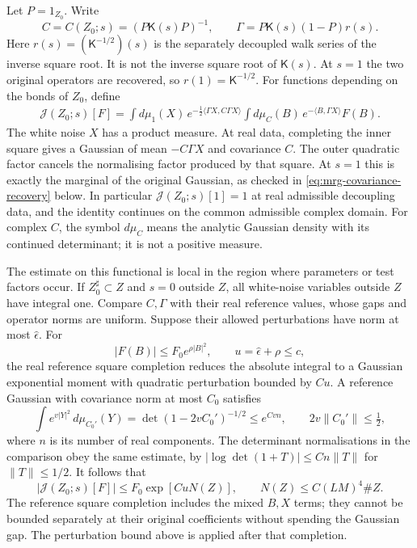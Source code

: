 \documentclass[11pt,letterpaper,reqno]{amsart}
\theoremstyle{definition}
\theoremstyle{remark}
\begin{document}
Let $P=1_{Z_0}$. Write
\[
 C=C(Z_0;s)=(P\mathsf K(s)P)^{-1},\qquad
 \Gamma=P\mathsf K(s)(1-P)r(s).
\]
Here $r(s)=(\mathsf K^{-1/2})(s)$ is the separately decoupled
walk series of the inverse square root. It is not the inverse
square root of $\mathsf K(s)$. At $s=1$ the two original
operators are recovered, so $r(1)=\mathsf K^{-1/2}$.
For functions depending on the bonds of $Z_0$, define
\begin{equation}\label{eq:deep-conditional-functional}
 \begin{split}
 \mathcal J(Z_0;s)[F]
 =\int d\mu_1(X)\,
      e^{-\frac12\langle\Gamma X,C\Gamma X\rangle}
       \int d\mu_C(B)\,
                    e^{-\langle B,\Gamma X\rangle}F(B).
 \end{split}
\end{equation}
The white noise $X$ has a product measure. At real data,
completing the inner square gives a Gaussian of mean
$-C\Gamma X$ and covariance $C$. The outer quadratic factor
cancels the normalising factor produced by that square. At
$s=1$ this is exactly the marginal of the original Gaussian,
as checked in \eqref{eq:mrg-covariance-recovery} below.
In particular $\mathcal J(Z_0;s)[1]=1$ at real admissible
decoupling data, and the identity continues on the common
admissible complex domain. For complex $C$, the symbol $d\mu_C$ means
the analytic Gaussian density with its continued determinant;
it is not a positive measure.

The estimate on this functional is local in the region where
parameters or test factors occur. If $Z_0^\sharp\subset Z$ and
$s=0$ outside $Z$, all white-noise variables outside $Z$ have
integral one. Compare $C,\Gamma$ with their real reference
values, whose gaps and operator norms are uniform. Suppose
their allowed perturbations have norm at most $\hat\epsilon$.
For
\[
 |F(B)|\le F_0e^{\rho|B|^2},\qquad
 u=\hat\epsilon+\rho\le c,
\]
the real reference square completion reduces the absolute
integral to a Gaussian exponential moment with quadratic
perturbation bounded by $Cu$. A reference Gaussian with
covariance norm at most $C_0$ satisfies
\[
 \int e^{v|Y|^2}\,d\mu_{C_0'}(Y)
       =\det(1-2vC_0')^{-1/2}
       \le e^{Cv n},\qquad 2v\|C_0'\|\le\tfrac12,
\]
where $n$ is its number of real components. The determinant
normalisations in the comparison obey the same estimate,
by $|\log\det(1+T)|\le Cn\|T\|$ for $\|T\|\le1/2$.
It follows that
\begin{equation}\label{eq:deep-local-gaussian-bound}
 |\mathcal J(Z_0;s)[F]|
       \le F_0\exp[CuN(Z)],\qquad
 N(Z)\le C(LM)^4\#Z.
\end{equation}
The reference square completion includes the mixed $B,X$
terms; they cannot be bounded separately at their original
coefficients without spending the Gaussian gap. The perturbation
bound above is applied after that completion.
\end{document}
